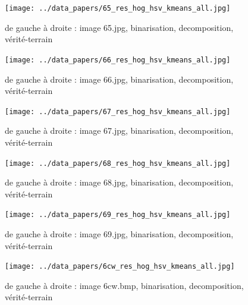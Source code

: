 \documentclass{book}
\begin{document}
\begin{figure}[H]
\begin{center}
\texttt{[image: ../data\_papers/65\_res\_hog\_hsv\_kmeans\_all.jpg]}
\end{center}
\caption{de gauche à droite : image 65.jpg, binarisation, decomposition, vérité-terrain}
\label{65}
\end{figure}
\clearpage


\begin{figure}[H]
\begin{center}
\texttt{[image: ../data\_papers/66\_res\_hog\_hsv\_kmeans\_all.jpg]}
\end{center}
\caption{de gauche à droite : image 66.jpg, binarisation, decomposition, vérité-terrain}
\label{66}
\end{figure}
\clearpage


\begin{figure}[H]
\begin{center}
\texttt{[image: ../data\_papers/67\_res\_hog\_hsv\_kmeans\_all.jpg]}
\end{center}
\caption{de gauche à droite : image 67.jpg, binarisation, decomposition, vérité-terrain}
\label{67}
\end{figure}
\clearpage


\begin{figure}[H]
\begin{center}
\texttt{[image: ../data\_papers/68\_res\_hog\_hsv\_kmeans\_all.jpg]}
\end{center}
\caption{de gauche à droite : image 68.jpg, binarisation, decomposition, vérité-terrain}
\label{68}
\end{figure}
\clearpage


\begin{figure}[H]
\begin{center}
\texttt{[image: ../data\_papers/69\_res\_hog\_hsv\_kmeans\_all.jpg]}
\end{center}
\caption{de gauche à droite : image 69.jpg, binarisation, decomposition, vérité-terrain}
\label{69}
\end{figure}
\clearpage


\begin{figure}[H]
\begin{center}
\texttt{[image: ../data\_papers/6cw\_res\_hog\_hsv\_kmeans\_all.jpg]}
\end{center}
\caption{de gauche à droite : image 6cw.bmp, binarisation, decomposition, vérité-terrain}
\label{6cw}
\end{figure}
\clearpage
\end{document}
